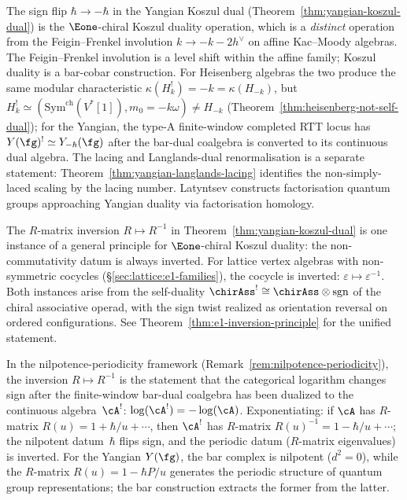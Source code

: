 \begin{remark}\label{rem:yangian-langlands}
The sign flip $\hbar \to -\hbar$ in the Yangian Koszul dual
(Theorem~\ref{thm:yangian-koszul-dual}) is the $\Eone$-chiral
Koszul duality operation, which is a \emph{distinct} operation
from the Feigin--Frenkel involution $k \to -k - 2h^\vee$ on
affine Kac--Moody algebras. The Feigin--Frenkel involution is a
level shift within the affine family; Koszul duality is a bar-cobar
construction. For Heisenberg algebras the two produce the same modular
characteristic $\kappa(H_k^!) = -k = \kappa(H_{-k})$, but
$H_k^!\simeq(\mathrm{Sym}^{\mathrm{ch}}(V^*[1]),m_0=-k\omega)
\neq H_{-k}$
\textup{(}Theorem~\textup{\ref{thm:heisenberg-not-self-dual}}\textup{)};
for the Yangian, the type-A finite-window completed RTT locus has
$Y(\fg)^! \simeq Y_{-\hbar}(\fg)$ after the bar-dual coalgebra is
converted to its continuous dual algebra. The lacing and Langlands-dual
renormalisation is a separate statement:
Theorem~\ref{thm:yangian-langlands-lacing} identifies the
non-simply-laced scaling by the lacing number. Latyntsev
\cite{Latyntsev23} constructs factorisation quantum groups
approaching Yangian duality via factorisation homology.
\end{remark}

\begin{remark}
\label{rem:yangian-e1-inversion}
The $R$-matrix inversion $R \mapsto R^{-1}$ in
Theorem~\ref{thm:yangian-koszul-dual} is one instance of a
general principle for $\Eone$-chiral Koszul duality: the
non-commutativity datum is always inverted. For lattice
vertex algebras with non-symmetric cocycles
(\S\ref{sec:lattice:e1-families}), the cocycle is inverted:
$\varepsilon \mapsto \varepsilon^{-1}$. Both instances arise from
the self-duality ${\chirAss}^! \cong \chirAss \otimes \mathrm{sgn}$
of the chiral associative operad, with the sign twist realized as
orientation reversal on ordered configurations. See
Theorem~\ref{thm:e1-inversion-principle} for the unified
statement.

In the nilpotence-periodicity framework
(Remark~\ref{rem:nilpotence-periodicity}), the inversion
$R \mapsto R^{-1}$ is the statement that the categorical logarithm
changes sign after the finite-window bar-dual coalgebra has been
dualized to the continuous algebra~$\cA^!$:
$\log(\cA^!) = -\log(\cA)$.
Exponentiating: if $\cA$ has $R$-matrix $R(u) = 1 + \hbar/u + \cdots$,
then $\cA^!$ has $R$-matrix $R(u)^{-1} = 1 - \hbar/u + \cdots$; the
nilpotent datum~$\hbar$ flips sign, and the periodic datum
($R$-matrix eigenvalues) is inverted. For the Yangian $Y(\fg)$, the
bar complex is nilpotent ($d^2 = 0$), while the $R$-matrix
$R(u) = 1 - \hbar P/u$ generates the periodic structure of quantum
group representations; the bar construction extracts the former from
the latter.
\end{remark}

